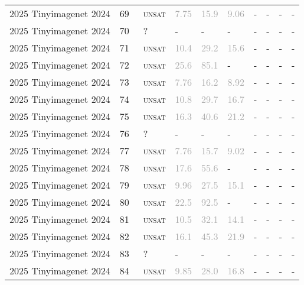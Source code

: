 \begin{center}
{\begin{longtable}{@{}llllllllll@{}}
2025 Tinyimagenet 2024 & 69 & ~\textsc{unsat} & \textcolor{darkgray}{7.75} & \textcolor{darkgray}{15.9} & \textcolor{darkgray}{9.06} & - & - & - & - \\
2025 Tinyimagenet 2024 & 70 & ~? & - & - & - & - & - & - & - \\
2025 Tinyimagenet 2024 & 71 & ~\textsc{unsat} & \textcolor{darkgray}{10.4} & \textcolor{darkgray}{29.2} & \textcolor{darkgray}{15.6} & - & - & - & - \\
2025 Tinyimagenet 2024 & 72 & ~\textsc{unsat} & \textcolor{darkgray}{25.6} & \textcolor{darkgray}{85.1} & - & - & - & - & - \\
2025 Tinyimagenet 2024 & 73 & ~\textsc{unsat} & \textcolor{darkgray}{7.76} & \textcolor{darkgray}{16.2} & \textcolor{darkgray}{8.92} & - & - & - & - \\
2025 Tinyimagenet 2024 & 74 & ~\textsc{unsat} & \textcolor{darkgray}{10.8} & \textcolor{darkgray}{29.7} & \textcolor{darkgray}{16.7} & - & - & - & - \\
2025 Tinyimagenet 2024 & 75 & ~\textsc{unsat} & \textcolor{darkgray}{16.3} & \textcolor{darkgray}{40.6} & \textcolor{darkgray}{21.2} & - & - & - & - \\
2025 Tinyimagenet 2024 & 76 & ~? & - & - & - & - & - & - & - \\
2025 Tinyimagenet 2024 & 77 & ~\textsc{unsat} & \textcolor{darkgray}{7.76} & \textcolor{darkgray}{15.7} & \textcolor{darkgray}{9.02} & - & - & - & - \\
2025 Tinyimagenet 2024 & 78 & ~\textsc{unsat} & \textcolor{darkgray}{17.6} & \textcolor{darkgray}{55.6} & - & - & - & - & - \\
2025 Tinyimagenet 2024 & 79 & ~\textsc{unsat} & \textcolor{darkgray}{9.96} & \textcolor{darkgray}{27.5} & \textcolor{darkgray}{15.1} & - & - & - & - \\
2025 Tinyimagenet 2024 & 80 & ~\textsc{unsat} & \textcolor{darkgray}{22.5} & \textcolor{darkgray}{92.5} & - & - & - & - & - \\
2025 Tinyimagenet 2024 & 81 & ~\textsc{unsat} & \textcolor{darkgray}{10.5} & \textcolor{darkgray}{32.1} & \textcolor{darkgray}{14.1} & - & - & - & - \\
2025 Tinyimagenet 2024 & 82 & ~\textsc{unsat} & \textcolor{darkgray}{16.1} & \textcolor{darkgray}{45.3} & \textcolor{darkgray}{21.9} & - & - & - & - \\
2025 Tinyimagenet 2024 & 83 & ~? & - & - & - & - & - & - & - \\
2025 Tinyimagenet 2024 & 84 & ~\textsc{unsat} & \textcolor{darkgray}{9.85} & \textcolor{darkgray}{28.0} & \textcolor{darkgray}{16.8} & - & - & - & - \\

\end{longtable}}
\end{center}
